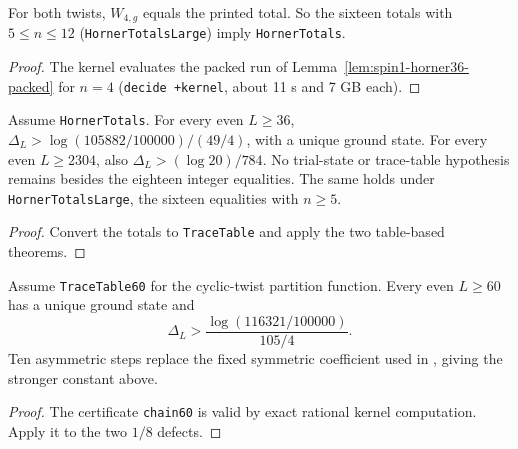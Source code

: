 \begin{lemma}
  \label{lem:kernel-horner-four}
  \leanok
  For both twists, \(W_{4,g}\) equals the printed total. So the sixteen totals with
  \(5 \le n \le 12\) (\texttt{HornerTotalsLarge}) imply \texttt{HornerTotals}.
\end{lemma}
\begin{proof}
  \leanok
  The kernel evaluates the packed run of Lemma~\ref{lem:spin1-horner36-packed} for \(n = 4\)
  (\texttt{decide +kernel}, about 11 s and 7 GB each).
\end{proof}

\begin{theorem}
  \label{thm:kernel-gap36-integers}
  \leanok
  Assume \texttt{HornerTotals}. For every even \(L\ge36\),
  \(\Delta_L>\log(105882/100000)/(49/4)\), with a unique ground state.
  For every even \(L\ge2304\), also \(\Delta_L>(\log20)/784\).
  No trial-state or trace-table hypothesis remains besides the eighteen integer equalities.
  The same holds under \texttt{HornerTotalsLarge}, the sixteen equalities with \(n \ge 5\).
\end{theorem}
\begin{proof}
  \leanok
  Convert the totals to \texttt{TraceTable} and apply the two table-based theorems.
\end{proof}

\begin{theorem}
  \label{thm:kernel-gap60-table}
  \leanok
  Assume \texttt{TraceTable60} for the cyclic-twist partition function.
  Every even \(L\ge60\) has a unique ground state and
  \[
    \Delta_L>\frac{\log(116321/100000)}{105/4}.
  \]
  Ten asymmetric steps replace the fixed symmetric coefficient used in
  \cite[equation (1.3)]{OpenAIHaldane}, giving the stronger constant above.
\end{theorem}
\begin{proof}
  \leanok
  The certificate \texttt{chain60} is valid by exact rational kernel computation.
  Apply it to the two \(1/8\) defects.
\end{proof}

